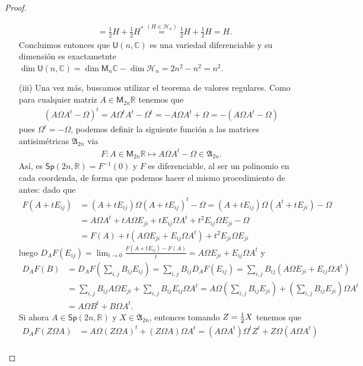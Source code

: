 \documentclass[11pt]{article}
\newcommand{\R}{\mathbb{R}}
\newcommand{\C}{\mathbb{C}}
\newcommand{\M}[2]{\mathsf{M}_{#1}#2}
\begin{document}
\begin{proof}
\begin{itemize}
\begin{align*}
&= \frac{1}{2}H+ \frac{1}{2}H^* \stackrel{(H \in \mathcal{H}_n)}{=} \frac{1}{2}H+ \frac{1}{2}H = H.
\end{align*}
Concluimos entonces que $\mathsf{U}(n,\C)$ es una variedad diferenciable y su dimensi\'on es exactametnte $\dim \mathsf{U}(n,\C) = \dim \M{n}{\C} - \dim \mathcal{H}_n = 2n^2 -n^2 = n^2$.
\item[(iii)] Una vez m\'as, buscamos utilizar el teorema de valores regulares. Como para cualquier matriz $A \in \M{2n}{\R}$ tenemos que 
\begin{align*}
(A\Omega A^t - \Omega)^t = A\Omega^t A^t - \Omega^t = -A\Omega A^t + \Omega = -(A\Omega A^t - \Omega)
\end{align*}
pues $\Omega^t = -\Omega$, podemos definir la siguiente funci\'on a las matrices antisim\'etricas $\mathfrak{A}_{2n}$ via
\begin{align*}
F : A \in \M{2n}{\R} \mapsto A\Omega A^t - \Omega \in \mathfrak{A}_{2n}.
\end{align*}
As\'i, es $\mathsf{Sp}(2n,\R) = F^{-1}(0)$ y $F$ es diferenciable, al ser un polinomio en cada coordenda, de forma que podemos hacer el mismo procedimiento de antes: dado que
\begin{align*}
F(A+tE_{ij}) &= (A+tE_{ij})\Omega(A+tE_{ij})^t - \Omega = (A+tE_{ij})\Omega(A^t+tE_{ji}) - \Omega \\
& = A\Omega A^t + tA\Omega E_{ji} + tE_{ij}\Omega A^t + t^2E_{ij}\Omega E_{ji} - \Omega\\
& = F(A) + t(A\Omega E_{ji} + E_{ij}\Omega A^t) +t^2E_{ji}\Omega E_{ji}
\end{align*}
luego $D_AF(E_{ij}) = \lim_{t \to 0}\frac{F(A+tE_{ij})-F(A)}{t} = A\Omega E_{ji} + E_{ij}\Omega A^t$ y
\begin{align*}
D_AF(B) &= D_AF\left(\sum_{i,j}B_{ij}E_{ij}\right) = \sum_{i,j}B_{ij}D_AF(E_{ij}) = \sum_{i,j}B_{ij}(A\Omega E_{ji} + E_{ij}\Omega A^t) \\
& = \sum_{i,j}B_{ij}A\Omega E_{ji} + \sum_{i,j}B_{ij}E_{ij}\Omega A^t = A\Omega\left(\sum_{i,j}B_{ij}E_{ji}\right) + \left(\sum_{i,j}B_{ij}E_{ji}\right)\Omega A^t\\
& = A \Omega B^t + B\Omega A^t.
\end{align*}
Si ahora $A \in \mathsf{Sp}(2n,\R)$ y $X \in \mathfrak{A}_{2n}$, entonces tomando $Z = \small{\frac{1}{2}}X$ tenemos que
\begin{align*}
D_AF(Z\Omega A) &= A \Omega (Z\Omega A)^t + (Z\Omega A)\Omega A^t = (A \Omega A^t)\Omega^t Z^t + Z\Omega(A\Omega A^t)\\

\end{align*}
\end{itemize}
\end{proof}
\end{document}
